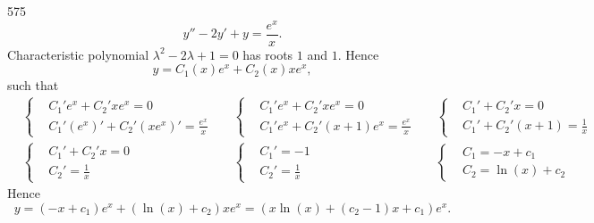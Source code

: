 \documentclass[12pt,a4paper]{article}
\begin{document}
    \begin{problem}{575}
        \[y'' - 2y' + y = \frac{e^x}{x}.\]
        Characteristic polynomial $\lambda^2 - 2\lambda + 1 = 0$ has roots $1$ and $1$. Hence
        \[y = C_1(x) e^x + C_2(x) x e^x,\]
        such that
        \begin{align*}
            &\left\{
                \begin{aligned}
                    &C_1' e^x + C_2' x e^x = 0\\
                    &C_1' (e^x)' + C_2' (x e^x)' = \frac{e^x}{x}
                \end{aligned}
            \right.&
            &\left\{
                \begin{aligned}
                    &C_1' e^x + C_2' x e^x = 0\\
                    &C_1' e^x + C_2' (x+1) e^x = \frac{e^x}{x}
                \end{aligned}
            \right.&
            &\left\{
                \begin{aligned}
                    &C_1' + C_2' x = 0\\
                    &C_1' + C_2' (x+1) = \frac{1}{x}
                \end{aligned}
            \right.\\
            &\left\{
                \begin{aligned}
                    &C_1' + C_2' x = 0\\
                    &C_2' = \frac{1}{x}
                \end{aligned}
            \right.&
            &\left\{
                \begin{aligned}
                    &C_1' = -1\\
                    &C_2' = \frac{1}{x}
                \end{aligned}
            \right.&
            &\left\{
                \begin{aligned}
                    &C_1 = -x + c_1\\
                    &C_2 = \ln(x) + c_2
                \end{aligned}
            \right.
        \end{align*}
        Hence
        \[y = (-x + c_1) e^x + (\ln(x) + c_2) x e^x = (x \ln(x) + (c_2 - 1) x + c_1) e^x.\]
    \end{problem}
\end{document}
